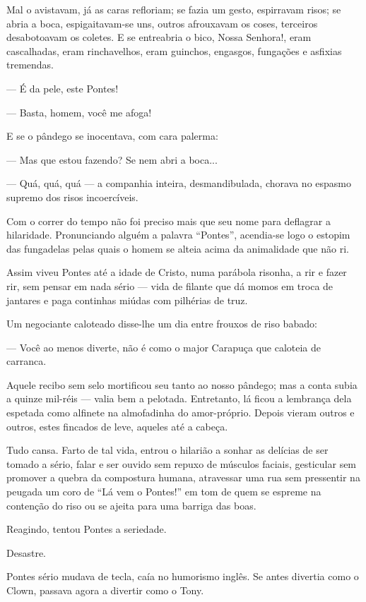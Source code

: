 Mal o avistavam, já as caras refloriam; se fazia um gesto, espirravam
risos; se abria a boca, espigaitavam-se uns, outros afrouxavam os coses,
terceiros desabotoavam os coletes. E se entreabria o bico, Nossa
Senhora!, eram cascalhadas, eram rinchavelhos, eram guinchos, engasgos,
fungações e asfixias tremendas.

--- É da pele, este Pontes!

--- Basta, homem, você me afoga!

E se o pândego se inocentava, com cara palerma:

--- Mas que estou fazendo? Se nem abri a boca...

--- Quá, quá, quá --- a companhia inteira, desmandibulada, chorava no
espasmo supremo dos risos incoercíveis.

Com o correr do tempo não foi preciso mais que seu nome para deflagrar a
hilaridade. Pronunciando alguém a palavra ``Pontes'', acendia-se logo o
estopim das fungadelas pelas quais o homem se alteia acima da
animalidade que não ri.

Assim viveu Pontes até a idade de Cristo, numa parábola risonha, a rir e
fazer rir, sem pensar em nada sério --- vida de filante que dá momos em
troca de jantares e paga continhas miúdas com pilhérias de truz.

Um negociante caloteado disse-lhe um dia entre frouxos de riso babado:

--- Você ao menos diverte, não é como o major Carapuça que caloteia de
carranca.

Aquele recibo sem selo mortificou seu tanto ao nosso pândego; mas a
conta subia a quinze mil-réis --- valia bem a pelotada. Entretanto, lá
ficou a lembrança dela espetada como alfinete na almofadinha do
amor-próprio. Depois vieram outros e outros, estes fincados de leve,
aqueles até a cabeça.

Tudo cansa. Farto de tal vida, entrou o hilarião a sonhar as delícias de
ser tomado a sério, falar e ser ouvido sem repuxo de músculos faciais,
gesticular sem promover a quebra da compostura humana, atravessar uma
rua sem pressentir na peugada um coro de ``Lá vem o Pontes!'' em tom de
quem se espreme na contenção do riso ou se ajeita para uma barriga das
boas.

Reagindo, tentou Pontes a seriedade.

Desastre.

Pontes sério mudava de tecla, caía no humorismo inglês. Se antes
divertia como o Clown, passava agora a divertir como o Tony.

